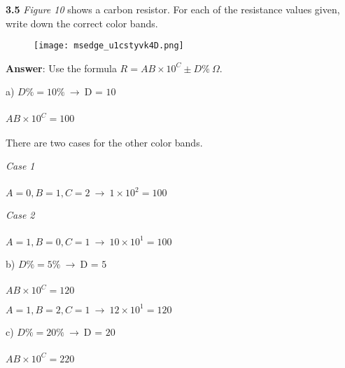 \documentclass{article}
\begin{document}
{\newpage

{\Large \textbf{3.5} \textit{Figure 10} shows a carbon resistor. For each of the resistance values given, write down the correct color bands.}

\begin{figure}[H]
    \centering
    \texttt{[image: msedge\_u1cstyvk4D.png]}
\end{figure}

{\Large {}}

{\vspace{4mm}}

{\Large \textbf{Answer}: Use the formula $R = AB \times 10^{C} \pm D\% \  \Omega$.}

{\vspace{4mm}}

{\Large a) $D\% = 10\% \ \rightarrow \ \boxed{\text{D = 10}}$ \\\\ $AB \times 10^{C} = 100$ \\\\ There are two cases for the other color bands.}

{\vspace{4mm}}

{\Large \textit{Case 1} \\\\ $\boxed{A = 0, B = 1, C = 2} \ \rightarrow \ 1 \times 10^{2} = 100$}

{\vspace{4mm}}

{\Large \textit{Case 2} \\\\ $\boxed{A = 1, B = 0, C = 1} \ \rightarrow \ 10 \times 10^{1} = 100$}

{\vspace{8mm}}

{\Large b) $D\% = 5\% \ \rightarrow \ \boxed{\text{D = 5}}$ \\\\ $AB \times 10^{C} = 120$}

{\vspace{4mm}}

{\Large $\boxed{A = 1, B = 2, C = 1} \ \rightarrow \ 12 \times 10^{1} = 120$}

{\vspace{8mm}}

{\Large c) $D\% = 20\% \ \rightarrow \ \boxed{\text{D = 20}}$ \\\\ $AB \times 10^{C} = 220$}

}
\end{document}
